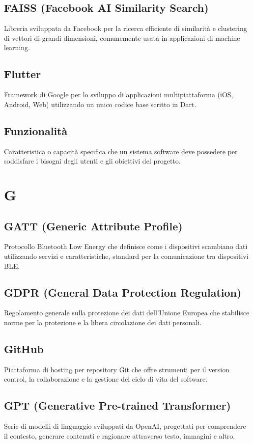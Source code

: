 \documentclass[a4paper,11pt]{article}
\begin{document}
\subsection{FAISS (Facebook AI Similarity Search)}
Libreria sviluppata da Facebook per la ricerca efficiente di similarità e clustering di vettori di grandi dimensioni, comunemente usata in applicazioni di machine learning.

\subsection{Flutter}
Framework di Google per lo sviluppo di applicazioni multipiattaforma (iOS, Android, Web) utilizzando un unico codice base scritto in Dart.

\subsection{Funzionalità}
Caratteristica o capacità specifica che un sistema software deve possedere per soddisfare i bisogni degli utenti e gli obiettivi del progetto.

\newpage
\section{G}

\subsection{GATT (Generic Attribute Profile)}
Protocollo Bluetooth Low Energy che definisce come i dispositivi scambiano dati utilizzando servizi e caratteristiche, standard per la comunicazione tra dispositivi BLE.

\subsection{GDPR (General Data Protection Regulation)}
Regolamento generale sulla protezione dei dati dell'Unione Europea che stabilisce norme per la protezione e la libera circolazione dei dati personali.

\subsection{GitHub}
Piattaforma di hosting per repository Git che offre strumenti per il version control, la collaborazione e la gestione del ciclo di vita del software.

\subsection{GPT (Generative Pre-trained Transformer)}
Serie di modelli di linguaggio sviluppati da OpenAI, progettati per comprendere il contesto, generare contenuti e ragionare attraverso testo, immagini e altro.
\end{document}
